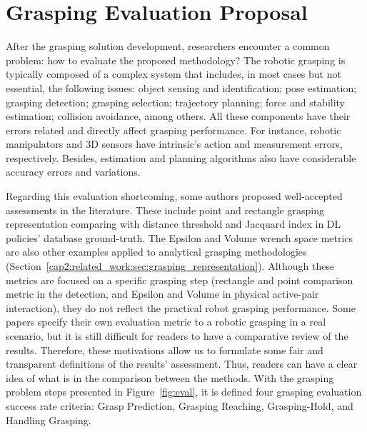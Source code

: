 

\chapter{Grasping Evaluation Proposal}
\label{cap3:grasping_eval}

After the grasping solution development, researchers encounter a common problem: how to evaluate the proposed methodology? The robotic grasping is typically composed of a complex system that includes, in most cases but not essential, the following issues: object sensing and identification; pose estimation; grasping detection; grasping selection; trajectory planning; force and stability estimation; collision avoidance, among others. All these components have their errors related and directly affect grasping performance. For instance, robotic manipulators and 3D sensors have intrinsic's action and measurement errors, respectively. Besides, estimation and planning algorithms also have considerable accuracy errors and variations.

Regarding this evaluation shortcoming, some authors proposed well-accepted assessments in the literature. These include point and rectangle grasping representation comparing with distance threshold and Jacquard index in \ac{DL} policies' database ground-truth. The Epsilon and Volume wrench space metrics are also other examples applied to analytical grasping methodologies (Section~\ref{cap2:related_work:sec:grasping_representation}). Although these metrics are focused on a specific grasping step (rectangle and point comparison metric in the detection, and Epsilon and Volume in physical active-pair interaction), they do not reflect the practical robot grasping performance. Some papers specify their own evaluation metric to a robotic grasping in a real scenario, but it is still difficult for readers to have a comparative review of the results. Therefore, these motivations allow us to formulate some fair and transparent definitions of the results' assessment. Thus, readers can have a clear idea of what is in the comparison between the methods. With the grasping problem steps presented in Figure~\ref{fig:eval}, it is defined four grasping evaluation success rate criteria: Grasp Prediction, Grasping Reaching, Grasping-Hold, and Handling Grasping.

